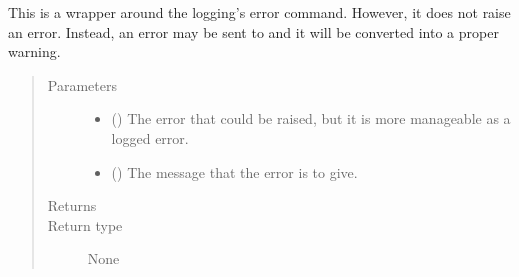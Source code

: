 \documentclass[letterpaper,10pt,english]{sphinxmanual}
\begin{document}
\begin{fulllineitems}
\label{\detokenize{docstrings/ifa_smeargle.core.error:ifa_smeargle.core.error.ifas_error}}
This is a wrapper around the logging’s error command.
However, it does not raise an error. Instead, an error may be
sent to and it will be converted into a proper warning.
\begin{quote}\begin{description}
\item[{Parameters}] \leavevmode\begin{itemize}
\item {} 
 () \textendash{} The error that could be raised, but it is more manageable as
a logged error.

\item {} 
 () \textendash{} The message that the error is to give.

\end{itemize}

\item[{Returns}] \leavevmode


\item[{Return type}] \leavevmode
None

\end{description}\end{quote}

\end{fulllineitems}

\end{document}
